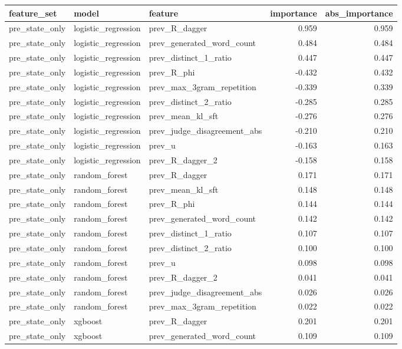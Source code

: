 \begin{tabular}{lllrr}
\toprule
feature_set & model & feature & importance & abs_importance \\
\midrule
pre_state_only & logistic_regression & prev_R_dagger & 0.959 & 0.959 \\
pre_state_only & logistic_regression & prev_generated_word_count & 0.484 & 0.484 \\
pre_state_only & logistic_regression & prev_distinct_1_ratio & 0.447 & 0.447 \\
pre_state_only & logistic_regression & prev_R_phi & -0.432 & 0.432 \\
pre_state_only & logistic_regression & prev_max_3gram_repetition & -0.339 & 0.339 \\
pre_state_only & logistic_regression & prev_distinct_2_ratio & -0.285 & 0.285 \\
pre_state_only & logistic_regression & prev_mean_kl_sft & -0.276 & 0.276 \\
pre_state_only & logistic_regression & prev_judge_disagreement_abs & -0.210 & 0.210 \\
pre_state_only & logistic_regression & prev_u & -0.163 & 0.163 \\
pre_state_only & logistic_regression & prev_R_dagger_2 & -0.158 & 0.158 \\
pre_state_only & random_forest & prev_R_dagger & 0.171 & 0.171 \\
pre_state_only & random_forest & prev_mean_kl_sft & 0.148 & 0.148 \\
pre_state_only & random_forest & prev_R_phi & 0.144 & 0.144 \\
pre_state_only & random_forest & prev_generated_word_count & 0.142 & 0.142 \\
pre_state_only & random_forest & prev_distinct_1_ratio & 0.107 & 0.107 \\
pre_state_only & random_forest & prev_distinct_2_ratio & 0.100 & 0.100 \\
pre_state_only & random_forest & prev_u & 0.098 & 0.098 \\
pre_state_only & random_forest & prev_R_dagger_2 & 0.041 & 0.041 \\
pre_state_only & random_forest & prev_judge_disagreement_abs & 0.026 & 0.026 \\
pre_state_only & random_forest & prev_max_3gram_repetition & 0.022 & 0.022 \\
pre_state_only & xgboost & prev_R_dagger & 0.201 & 0.201 \\
pre_state_only & xgboost & prev_generated_word_count & 0.109 & 0.109 \\

\end{tabular}
